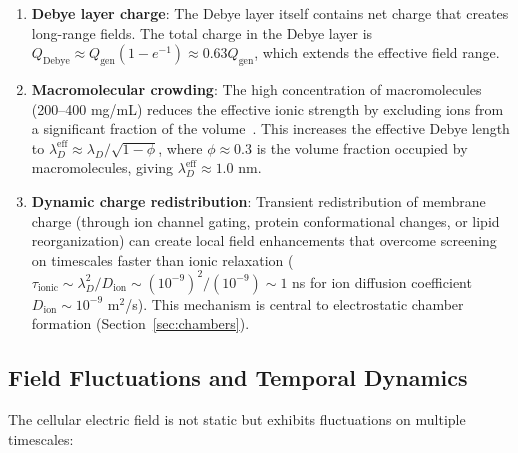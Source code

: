 \documentclass[twocolumn,10pt,aps,prd,superscriptaddress,floatfix,nofootinbib]{revtex4-2}
\theoremstyle{remark}
\begin{document}
\begin{enumerate}
\item \textbf{Debye layer charge}: The Debye layer itself contains net charge that creates long-range fields. The total charge in the Debye layer is $Q_{\mathrm{Debye}} \approx Q_{\mathrm{gen}}(1 - e^{-1}) \approx 0.63 Q_{\mathrm{gen}}$, which extends the effective field range.

\item \textbf{Macromolecular crowding}: The high concentration of macromolecules (200--400 mg/mL) reduces the effective ionic strength by excluding ions from a significant fraction of the volume~\cite{Minton2001}. This increases the effective Debye length to $\lambda_D^{\mathrm{eff}} \approx \lambda_D/\sqrt{1 - \phi}$, where $\phi \approx 0.3$ is the volume fraction occupied by macromolecules, giving $\lambda_D^{\mathrm{eff}} \approx 1.0$ nm.

\item \textbf{Dynamic charge redistribution}: Transient redistribution of membrane charge (through ion channel gating, protein conformational changes, or lipid reorganization) can create local field enhancements that overcome screening on timescales faster than ionic relaxation ($\tau_{\mathrm{ionic}} \sim \lambda_D^2/D_{\mathrm{ion}} \sim (10^{-9})^2/(10^{-9}) \sim 1$ ns for ion diffusion coefficient $D_{\mathrm{ion}} \sim 10^{-9}$ m$^2$/s). This mechanism is central to electrostatic chamber formation (Section~\ref{sec:chambers}).
\end{enumerate}

\subsection{Field Fluctuations and Temporal Dynamics}

The cellular electric field is not static but exhibits fluctuations on multiple timescales:
\end{document}
